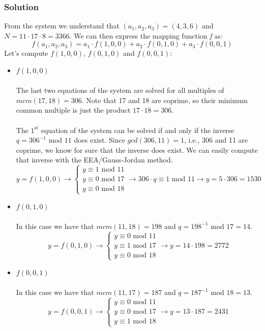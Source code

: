 \documentclass[11pt, a4paper]{article}
\newcommand{\mymod}{
    \text{ mod }
}
\begin{document}
\subsubsection*{Solution}
From the system we understand that $(a_1,a_2,a_3)=(4,3,6)$ and $N=11\cdot17\cdot8=3366$. We can then express the mapping function \textit{f} as:
$$f(a_1,a_2,a_3)=a_1\cdot f(1,0,0)+a_2\cdot f(0,1,0)+a_3\cdot f(0,0,1)$$
Let's compute $f(1,0,0)$, $f(0,1,0)$ and $f(0,0,1)$:
\begin{itemize}
    \item $f(1,0,0)$\\\\The last two equations of the system are solved for all multiples of $mcm(17,18)=306$. Note that 17 and 18 are coprime, so their minimum common multiple is just the product $17\cdot18=306$.\\\\
    The $1^{\text{st}}$ equation of the system can be solved if and only if the inverse $q=306^{-1}\mymod11$ does exist. Since $gcd(306, 11)=1$, i.e., 306 and 11 are coprime, we know for sure that the inverse does exist. We can easily compute that inverse with the EEA/Gauss-Jordan method.
    \begin{equation*}
        y=f(1,0,0)\longrightarrow
        \begin{cases}
            y\equiv1\mymod11\\
            y\equiv0\mymod17\\
            y\equiv0\mymod18
        \end{cases}\longrightarrow
        306\cdot q\equiv1\mymod11
        \longrightarrow y=5\cdot306=1530
    \end{equation*}
    \item $f(0,1,0)$\\\\In this case we have that $mcm(11,18)=198$ and $q=198^{-1}\mymod17=14$.
    \begin{equation*}
        y=f(0,1,0)\longrightarrow
        \begin{cases}
            y\equiv0\mymod11\\
            y\equiv1\mymod17\\
            y\equiv0\mymod18
        \end{cases}
        \longrightarrow y=14\cdot198=2772
    \end{equation*}
    \item $f(0,0,1)$\\\\In this case we have that $mcm(11,17)=187$ and $q=187^{-1}\mymod18=13$.
    \begin{equation*}
        y=f(0,0,1)\longrightarrow
        \begin{cases}
            y\equiv0\mymod11\\
            y\equiv0\mymod17\\
            y\equiv1\mymod18
        \end{cases}
        \longrightarrow y=13\cdot187=2431
    \end{equation*}
\end{itemize}
\end{document}
